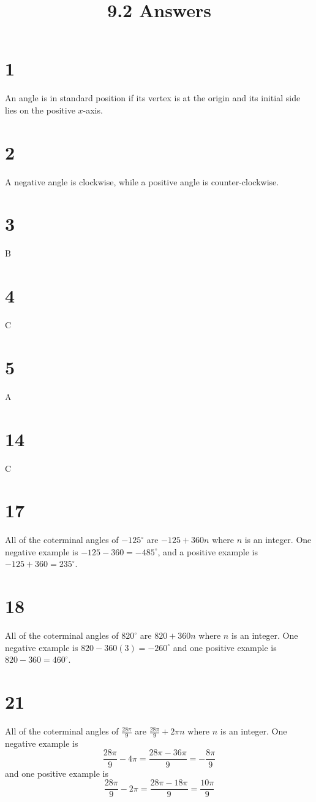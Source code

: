 \documentclass{article}
\title{9.2 Answers}
\theoremstyle{definition}
\newcommand{\?}{\stackrel{?}{=}}
\begin{document}
\maketitle

\section*{1}
An angle is in standard position if its vertex is at the origin and its initial side lies on the positive $x$-axis.

\section*{2}
A negative angle is clockwise, while a positive angle is counter-clockwise.

\section*{3}
B

\section*{4}
C

\section*{5}
A

\section*{14}
C

\section*{17}
All of the coterminal angles of $-125^\circ$ are $-125+360n$ where $n$ is an integer. One negative example is $-125-360=-485^\circ$, and a positive example is
$-125+360=235^\circ$.

\section*{18}
All of the coterminal angles of $820^\circ$ are $820+360n$ where $n$ is an integer. One negative example is $820-360(3)=-260^\circ$ and one positive example is
$820-360=460^\circ$.

\section*{21}
All of the coterminal angles of $\frac{28\pi}{9}$ are $\frac{28\pi}{9}+2\pi n$ where $n$ is an integer. One negative example is
\[ \frac{28\pi}{9}-4\pi=\frac{28\pi-36\pi}{9}=-\frac{8\pi}{9} \]
and one positive example is
\[ \frac{28\pi}{9}-2\pi=\frac{28\pi-18\pi}{9}=\frac{10\pi}{9} \]
\end{document}
